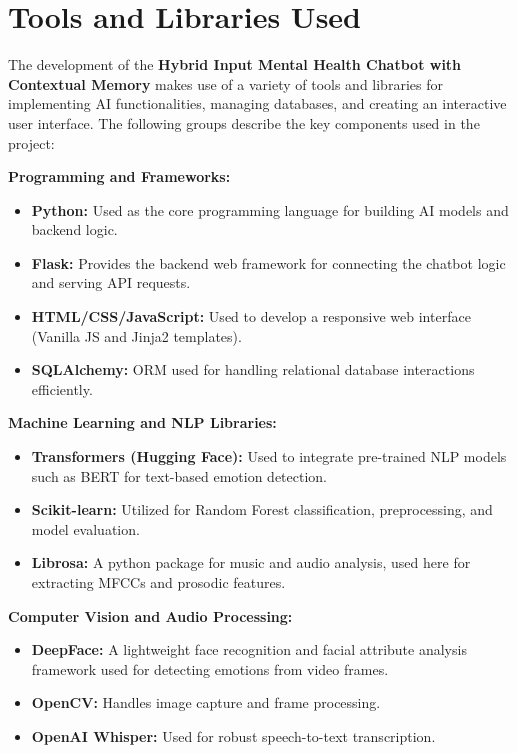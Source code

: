 \section{Tools and Libraries Used}

The development of the \textbf{Hybrid Input Mental Health Chatbot with Contextual Memory} makes use of a variety of tools and libraries for implementing AI functionalities, managing databases, and creating an interactive user interface. The following groups describe the key components used in the project:

\textbf{Programming and Frameworks:}

\begin{itemize}
    \item \textbf{Python:} Used as the core programming language for building AI models and backend logic.
    \item \textbf{Flask:} Provides the backend web framework for connecting the chatbot logic and serving API requests.
    \item \textbf{HTML/CSS/JavaScript:} Used to develop a responsive web interface (Vanilla JS and Jinja2 templates).
    \item \textbf{SQLAlchemy:} ORM used for handling relational database interactions efficiently.
\end{itemize}

\textbf{Machine Learning and NLP Libraries:}

\begin{itemize}
    \item \textbf{Transformers (Hugging Face):} Used to integrate pre-trained NLP models such as BERT for text-based emotion detection.
    \item \textbf{Scikit-learn:} Utilized for Random Forest classification, preprocessing, and model evaluation.
    \item \textbf{Librosa:} A python package for music and audio analysis, used here for extracting MFCCs and prosodic features.
\end{itemize}

\textbf{Computer Vision and Audio Processing:}

\begin{itemize}
    \item \textbf{DeepFace:} A lightweight face recognition and facial attribute analysis framework used for detecting emotions from video frames.
    \item \textbf{OpenCV:} Handles image capture and frame processing.
    \item \textbf{OpenAI Whisper:} Used for robust speech-to-text transcription.
\end{itemize}

